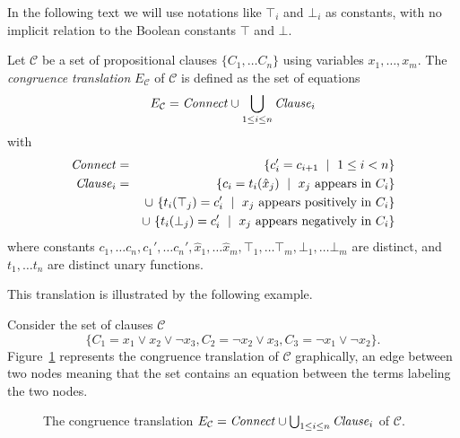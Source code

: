 \documentclass[smallextended]{svjour3}
\begin{document}
In the following text we will use notations like $\top_i$ and $\bot_i$ as constants, with
no implicit relation to the Boolean constants $\top$ and $\bot$.

\begin{definition}
Let $\mathcal{C}$ be a set of propositional clauses $\{C_1,\ldots C_n\}$ using variables $x_1,\ldots,x_m$.
The \emph{congruence translation} $E_{\mathcal{C}}$ of\/ $\mathcal{C}$ is defined as the set of equations
\begin{equation*}
E_{\mathcal{C}} = {\it Connect} \cup \bigcup_{1 \leq i \leq n}{\it Clause}_i 
\end{equation*}
with
\begin{eqnarray*}
	{\it Connect} &=& \{ c_{i}' = c_{i+1} \ \mid\ 1 \leq i < n\}\\
        {\it Clause}_i &=& \{ c_i = t_i(\hat{x}_j) \ \mid\ x_j \text{ appears in } C_i \}\\
           & & \cup\ \{ t_i(\top_j) = c_i' \ \mid\ x_j \text{ appears positively in } C_i \}\\
           & & \cup\ \{ t_i(\bot_j) = c_i' \ \mid\ x_j \text{ appears negatively in } C_i \}
\end{eqnarray*}
where constants $c_{1},\dots c_{n},c_{1}', \dots c_{n}',
\hat{x}_1, \dots \hat{x}_m, \top_1, \dots \top_m, \bot_1, \dots \bot_m$ are distinct, and $t_1, \dots t_n$ are
distinct unary functions.

\end{definition}

\noindent This translation is illustrated by the following example.

\begin{example}\label{ex:np1}
Consider the set of clauses $\mathcal{C}$
\begin{equation*}
\big\{C_1 = x_1 \vee x_2 \vee \neg x_3, C_2 = \neg x_2 \vee x_3, C_3 = \neg x_1 \vee \neg x_2\big\}.
\end{equation*}
Figure~\ref{fig:npexamplebig} represents the congruence translation of
$\mathcal{C}$ graphically, an edge between two nodes meaning that the set
contains an equation between the terms labeling the two nodes.

\begin{figure}[htb]

\caption{The congruence translation $E_{\mathcal{C}} = {\it Connect} \cup \bigcup_{1 \leq i \leq n}{\it Clause}_i$ of $\mathcal{C}$.}
\label{fig:npexamplebig}
\end{figure}

\end{example}
\end{document}
